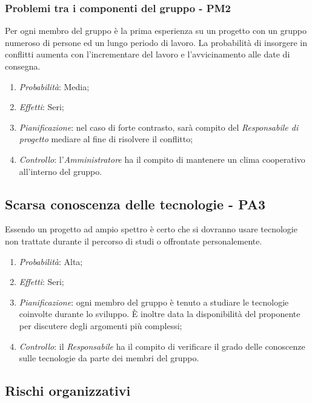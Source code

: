\subsubsection{Problemi tra i componenti del gruppo - PM2}
Per ogni membro del gruppo \`e la prima esperienza su un progetto con un gruppo numeroso di persone ed un lungo periodo di lavoro. La probabilit\`a di insorgere in conflitti aumenta con l'incrementare del lavoro e l'avvicinamento alle date di consegna.
\begin{enumerate}
\item \textit{Probabilit\`a}: Media;
\item \textit{Effetti}: Seri;
\item \textit{Pianificazione}: nel caso di forte contrasto, sar\`a compito del \textit{Responsabile di progetto} mediare al fine di risolvere il conflitto;
\item \textit{Controllo}: l'\textit{Amministratore} ha il compito di mantenere un clima cooperativo all'interno del gruppo.
\end{enumerate} 

\subsection{Scarsa conoscenza delle tecnologie - PA3}
Essendo un progetto ad ampio spettro \`e certo che si dovranno usare tecnologie non trattate durante il percorso di studi o offrontate personalemente.
\begin{enumerate}
\item \textit{Probabilit\`a}: Alta;
\item \textit{Effetti}: Seri;
\item \textit{Pianificazione}: ogni membro del gruppo \`e tenuto a studiare le tecnologie coinvolte durante lo sviluppo. \`E inoltre data la disponibilit\`a del proponente per discutere degli argomenti pi\`u complessi;
\item \textit{Controllo}: il \textit{Responsabile} ha il compito di verificare il grado delle conoscenze sulle tecnologie da parte dei membri del gruppo.
\end{enumerate}

\subsection{Rischi organizzativi}
